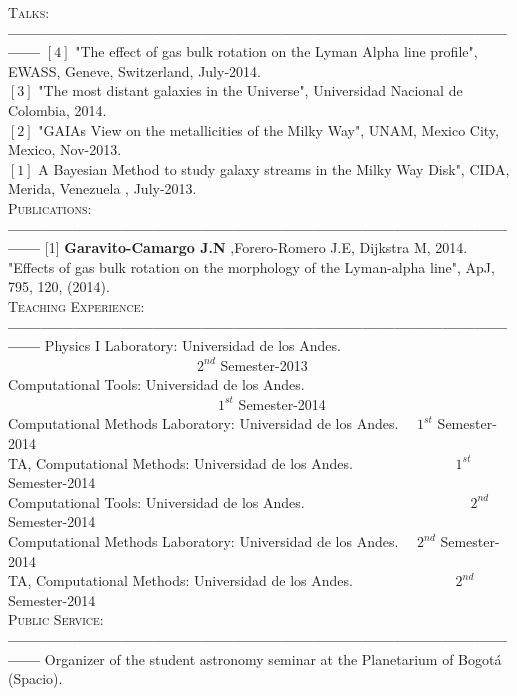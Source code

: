 \documentclass[letterpaper]{article}
\begin{document}
\textsc{\Large Talks:}\\
{\bf---------------------------------------------------------------------------------------------------}
$\left[4\right]$ "The effect of gas bulk rotation on the Lyman Alpha line profile", EWASS, Geneve, Switzerland, July-2014.\\
$\left[3\right]$  "The most distant galaxies in the Universe", Universidad Nacional de Colombia, 2014.\\
$\left[2\right]$ "GAIAs View on the metallicities of the Milky Way", UNAM, Mexico City, Mexico, Nov-2013. \\
$\left[1\right]$  A Bayesian Method to study galaxy streams in the Milky Way Disk", CIDA, Merida, Venezuela , July-2013.\\

\textsc{\Large Publications:}\\
{\bf---------------------------------------------------------------------------------------------------}
[1] {\bf Garavito-Camargo J.N} ,Forero-Romero J.E, Dijkstra M, 2014. "Effects of gas bulk rotation on the morphology of
the Lyman-alpha line", ApJ, 795, 120, (2014).\\

\textsc{\Large Teaching Experience:}\\
{\bf---------------------------------------------------------------------------------------------------}
Physics I Laboratory: Universidad de los Andes. \indent \ \ \ \ \ \ \ \ \ \ \ \ \ \ \ \ \ \ \ \ \ \ \ \ \ \ \ $2^{nd}$ Semester-2013\\
Computational Tools: Universidad de los Andes. \indent \ \ \ \ \ \ \ \ \ \ \ \ \ \ \ \ \ \ \ \ \ \ \ \ \ \ \ \ \ \ $1^{st}$ Semester-2014\\
Computational Methods Laboratory: Universidad de los Andes. \indent  \ \ $1^{st}$ Semester-2014\\
TA, Computational Methods: Universidad de los Andes. \indent \ \ \ \ \ \ \ \ \ \ \ \ \ \   $1^{st}$ Semester-2014\\
Computational Tools: Universidad de los Andes. \indent \ \ \ \ \ \ \ \ \ \ \ \ \ \ \ \ \ \ \ \ \ \ \ $2^{nd}$ Semester-2014\\
Computational Methods Laboratory: Universidad de los Andes. \indent  \ \ $2^{nd}$ Semester-2014\\
TA, Computational Methods: Universidad de los Andes. \indent \ \ \ \ \ \ \ \ \ \ \ \ \ \   $2^{nd}$ Semester-2014\\

\textsc{\Large Public Service:}\\
{\bf---------------------------------------------------------------------------------------------------}
Organizer of the student astronomy seminar at the Planetarium of Bogot\'a (Spacio).
\end{document}
